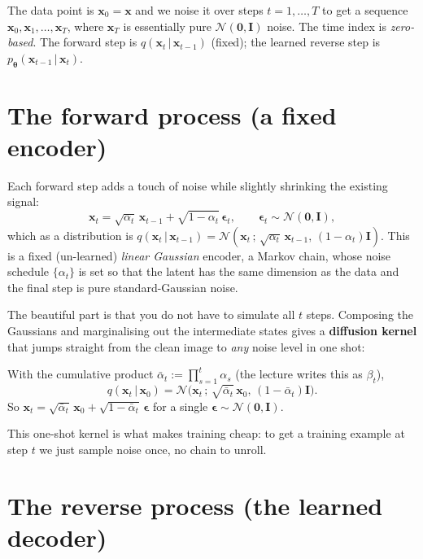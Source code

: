 \documentclass[11pt, oneside]{book}
\newcommand{\eye}{\mathbf{I}}
\newcommand{\zeros}{\mathbf{0}}
\newcommand{\params}{\boldsymbol{\theta}}
\newcommand{\xvec}{\mathbf{x}}
\newcommand{\Normal}{\mathcal{N}}
\newcommand{\given}{\,\vert\,}
\begin{document}
\begin{notebox}[title={Notation}]
The data point is $\xvec_0 = \xvec$ and we noise it over steps $t = 1,\dots,T$ to
get a sequence $\xvec_0, \xvec_1, \dots, \xvec_T$, where $\xvec_T$ is essentially
pure $\Normal(\zeros,\eye)$ noise. The time index is \emph{zero-based}. The
forward step is $q(\xvec_t\given\xvec_{t-1})$ (fixed); the learned reverse step is
$p_{\params}(\xvec_{t-1}\given\xvec_t)$.
\end{notebox}

\section{The forward process (a fixed encoder)}

Each forward step adds a touch of noise while slightly shrinking the existing
signal:
\[
  \xvec_t = \sqrt{\alpha_t}\,\xvec_{t-1} + \sqrt{1-\alpha_t}\,\boldsymbol{\epsilon}_t,
  \qquad \boldsymbol{\epsilon}_t \sim \Normal(\zeros,\eye),
\]
which as a distribution is $q(\xvec_t\given\xvec_{t-1}) =
\Normal(\xvec_t \,;\, \sqrt{\alpha_t}\,\xvec_{t-1},\,(1-\alpha_t)\eye)$. This is a
fixed (un-learned) \emph{linear Gaussian} encoder, a Markov chain, whose noise
schedule $\{\alpha_t\}$ is set so that the latent has the same dimension as the
data and the final step is pure standard-Gaussian noise.

The beautiful part is that you do not have to simulate all $t$ steps. Composing the
Gaussians and marginalising out the intermediate states gives a \textbf{diffusion
kernel} that jumps straight from the clean image to \emph{any} noise level in one
shot:

\begin{thmbox}[title={Diffusion kernel (jump to step $t$)}]
With the cumulative product $\bar{\alpha}_t := \prod_{s=1}^{t}\alpha_s$ (the
lecture writes this as $\beta_t$),
\[
  q(\xvec_t \given \xvec_0)
  = \Normal\!\bigl(\xvec_t \,;\, \sqrt{\bar{\alpha}_t}\,\xvec_0,\,
                   (1-\bar{\alpha}_t)\eye\bigr).
\]
So $\xvec_t = \sqrt{\bar{\alpha}_t}\,\xvec_0 + \sqrt{1-\bar{\alpha}_t}\,
\boldsymbol{\epsilon}$ for a single $\boldsymbol{\epsilon}\sim\Normal(\zeros,\eye)$.
\end{thmbox}

This one-shot kernel is what makes training cheap: to get a training example at
step $t$ we just sample noise once, no chain to unroll.

\section{The reverse process (the learned decoder)}
\end{document}
